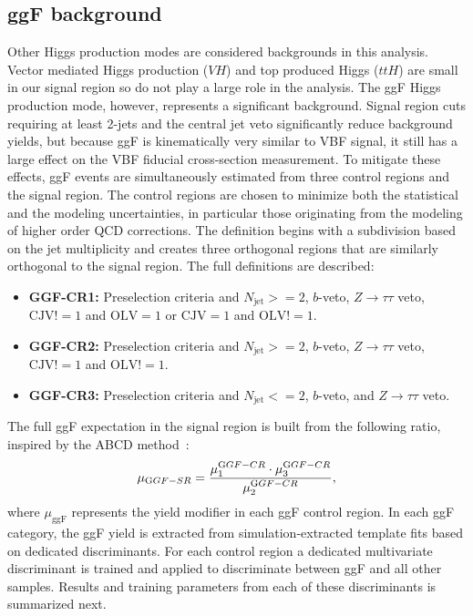 \subsection{ggF background}
Other Higgs production modes are considered backgrounds in this analysis. Vector mediated Higgs production ($VH$) and top produced Higgs ($ttH$) are small in our signal region so do not play a large role in the analysis. The ggF Higgs production mode, however, represents a significant background. Signal region cuts requiring at least 2-jets and the central jet veto significantly reduce background yields, but because ggF is kinematically very similar to VBF signal, it still has a large effect on the VBF fiducial cross-section measurement. To mitigate these effects, ggF events are simultaneously estimated from three control regions and the signal region. The control regions are chosen to minimize both the statistical and the modeling uncertainties, in particular those originating from the modeling of higher order QCD corrections. The definition begins with a subdivision based on the jet multiplicity and creates three orthogonal regions that are similarly orthogonal to the signal region. The full definitions are described:  
\begin{itemize} 
\item {\textbf{GGF-CR1:}} Preselection criteria and $N_{ \text{jet}}>=2$, $b$-veto, $Z\rightarrow\tau\tau$ veto, $\text{CJV} != 1$ and $\text{OLV} = 1$ or $\text{CJV} = 1 $ and $\text{OLV} != 1$. 
\item {\textbf{GGF-CR2:}} Preselection criteria and $N_{ \text{jet}}>=2$, $b$-veto, $Z\rightarrow\tau\tau$ veto, $\text{CJV} != 1$ and $\text{OLV} != 1$.
\item {\textbf{GGF-CR3:}} Preselection criteria and $N_{ \text{jet}}<=2$, $b$-veto, and $Z\rightarrow\tau\tau$ veto. 
\end{itemize} 
The full ggF expectation in the signal region is built from the following ratio, inspired by the ABCD method~\cite{ABCD}: 
\begin{equation}
	\mu_{{\text GGF-SR}} = \frac{\mu^{{\text GGF-CR}}_{1} \cdot\mu^{{\text GGF-CR}}_{3}}{ \mu^{{\text GGF-CR}}_{2}},
\end{equation}
where $\mu_{\text{ggF}}$ represents the yield modifier in each ggF control region. In each ggF category, the ggF yield is extracted from simulation-extracted template fits based on dedicated discriminants. For each control region a dedicated multivariate discriminant is trained and applied to discriminate between ggF and all other samples. Results and training parameters from each of these discriminants is summarized next.


